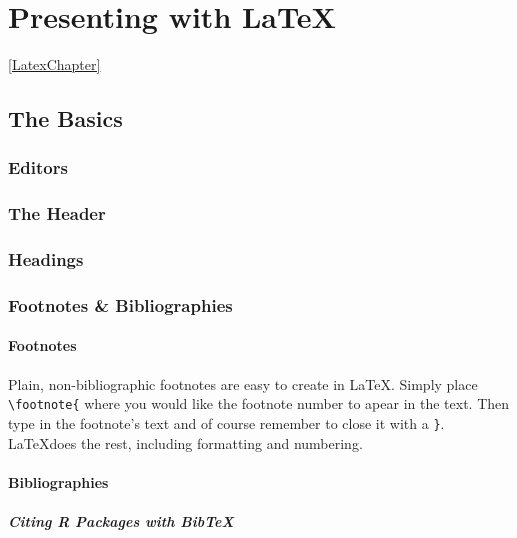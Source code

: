 \documentclass[ChapterTOCs,krantz1]{krantz}\usepackage{graphicx, color}
\begin{document}




\chapter{Presenting with \LaTeX}\ref{LatexChapter}

\section{The Basics}

\subsection{Editors}

\subsection{The Header}

\subsection{Headings}

\subsection{Footnotes \& Bibliographies}

\subsubsection{Footnotes}

Plain, non-bibliographic footnotes are easy to create in \LaTeX. Simply place \texttt{\textbackslash{}footnote\{} where you would like the footnote number to apear in the text. Then type in the footnote's text and of course remember to close it with a \texttt{\}}. \LaTeX does the rest, including formatting and numbering.

\subsubsection{Bibliographies}

\paragraph{Citing R Packages with BibTeX}
\end{document}
